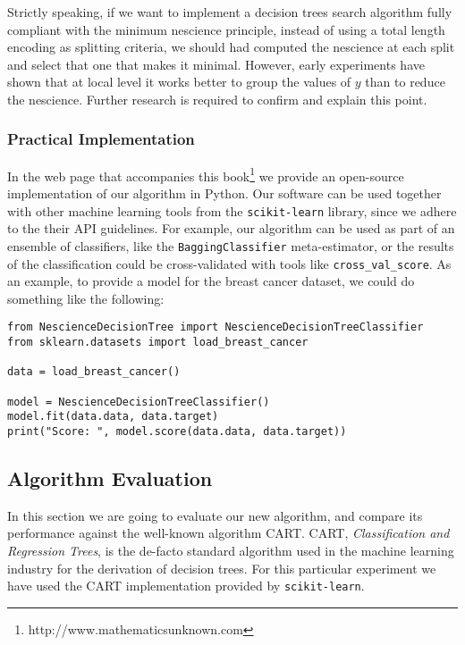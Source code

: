 \begin{remark}
Strictly speaking, if we want to implement a decision trees search algorithm fully compliant with the minimum nescience principle, instead of using a total length encoding as splitting criteria, we should had computed the nescience at each split and select that one that makes it minimal. However, early experiments have shown that at local level it works better to group the values of $y$ than to reduce the nescience. Further research is required to confirm and explain this point.
\end{remark}

\subsubsection*{Practical Implementation}

In the web page that accompanies this book\footnote{http://www.mathematicsunknown.com} we provide an open-source implementation of our algorithm in Python. Our software can be used together with other machine learning tools from the \texttt{scikit-learn} library, since we adhere to the their API guidelines. For example, our algorithm can be used as part of an ensemble of classifiers, like the \texttt{BaggingClassifier} meta-estimator, or the results of the classification could be cross-validated with tools like \texttt{cross\_val\_score}. As an example, to provide a model for the breast cancer dataset, we could do something like the following:

\begin{sourcecode}
{\scriptsize \begin{verbatim}
from NescienceDecisionTree import NescienceDecisionTreeClassifier
from sklearn.datasets import load_breast_cancer

data = load_breast_cancer()

model = NescienceDecisionTreeClassifier()
model.fit(data.data, data.target)
print("Score: ", model.score(data.data, data.target))
\end{verbatim}}
\end{sourcecode}

\subsection{Algorithm Evaluation}
\label{sub:algorithm_evaluation}

In this section we are going to evaluate our new algorithm, and compare its performance against the well-known algorithm CART. CART, \emph{Classification and Regression Trees}, is the de-facto standard algorithm used in the machine learning industry for the derivation of decision trees. For this particular experiment we have used the CART implementation provided by \texttt{scikit-learn}.

